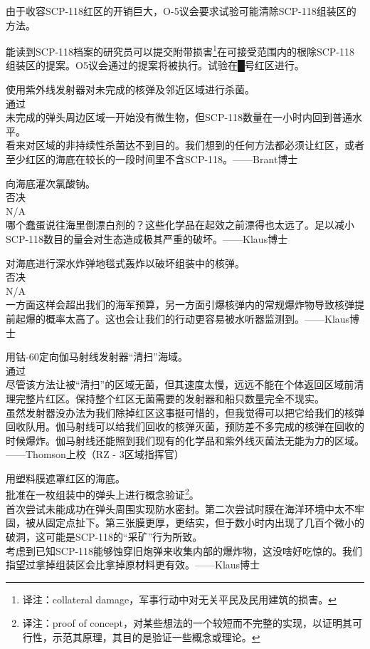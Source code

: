 由于收容SCP-118红区的开销巨大，O-5议会要求试验可能清除SCP-118组装区的方法。



\begin{scpbox}

能读到SCP-118档案的研究员可以提交附带损害\footnote{译注：collateral damage，军事行动中对无关平民及民用建筑的损害。}在可接受范围内的根除SCP-118组装区的提案。O5议会通过的提案将被执行。试验在█号红区进行。

使用紫外线发射器对未完成的核弹及邻近区域进行杀菌。\\
通过\\
未完成的弹头周边区域一开始没有微生物，但SCP-118数量在一小时内回到普通水平。\\
看来对区域的非持续性杀菌达不到目的。我们想到的任何方法都必须让红区，或者至少红区的海底在较长的一段时间里不含SCP-118。——Brant博士

向海底灌次氯酸钠。\\
否决\\
N\slash A\\
哪个蠢蛋说往海里倒漂白剂的？这些化学品在起效之前漂得也太远了。足以减小SCP-118数目的量会对生态造成极其严重的破坏。——Klaus博士

对海底进行深水炸弹地毯式轰炸以破坏组装中的核弹。\\
否决\\
N\slash A\\
一方面这样会超出我们的海军预算，另一方面引爆核弹内的常规爆炸物导致核弹提前起爆的概率太高了。这也会让我们的行动更容易被水听器监测到。——Klaus博士

用钴-60定向伽马射线发射器“清扫”海域。\\
通过\\
尽管该方法让被“清扫”的区域无菌，但其速度太慢，远远不能在个体返回区域前清理完整片红区。保持整个红区无菌需要的发射器和船只数量完全不现实。\\
虽然发射器没办法为我们除掉红区这事挺可惜的，但我觉得可以把它给我们的核弹回收队用。伽马射线可以给我们回收的核弹灭菌，预防差不多完成的核弹在回收的时候爆炸。伽马射线还能照到我们现有的化学品和紫外线灭菌法无能为力的区域。——Thomson上校（RZ - 3区域指挥官）

用塑料膜遮罩红区的海底。\\
批准在一枚组装中的弹头上进行概念验证\footnote{译注：proof of concept，对某些想法的一个较短而不完整的实现，以证明其可行性，示范其原理，其目的是验证一些概念或理论。}。\\
首次尝试未能成功在弹头周围实现防水密封。第二次尝试时膜在海洋环境中太不牢固，被从固定点扯下。第三张膜更厚，更结实，但于数小时内出现了几百个微小的破洞，这可能是SCP-118的“采矿”行为所致。\\
考虑到已知SCP-118能够蚀穿旧炮弹来收集内部的爆炸物，这没啥好吃惊的。我们指望过拿掉组装区会比拿掉原材料更有效。——Klaus博士


\end{scpbox}
